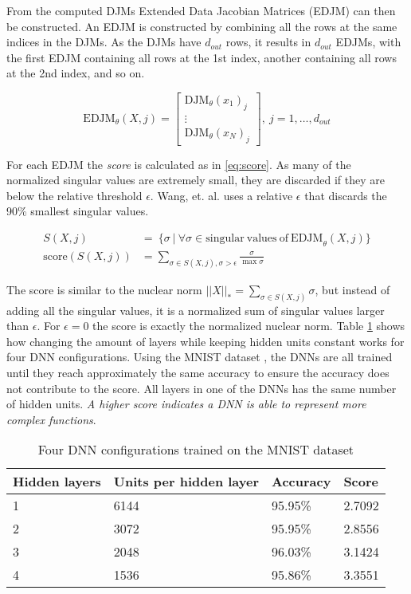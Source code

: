 From the computed DJMs Extended Data Jacobian Matrices (EDJM) can then be constructed. An EDJM is constructed by combining all the rows at the same indices in the DJMs. As the DJMs have $d_{out}$ rows, it results in $d_{out}$ EDJMs, with the first EDJM containing all rows at the 1st index, another containing all rows at the 2nd index, and so on.

\begin{equation} \label{eq:edjm}
\mathrm{EDJM}_{\theta}(X, j) =
\begin{bmatrix}
\mathrm{DJM}_{\theta}(x_1)_j \\
\vdots \\
\mathrm{DJM}_{\theta}(x_N)_j
\end{bmatrix},\ j=1,\dots,d_{out}
\end{equation}

For each EDJM the \textit{score} is calculated as in \eqref{eq:score}. As many of the normalized singular values are extremely small, they are discarded if they are below the relative threshold $\epsilon$. Wang, et. al. uses a relative $\epsilon$ that discards the 90\% smallest singular values.

\begin{equation} \label{eq:score}
  \begin{split}
  S(X, j) &=\ \{\sigma\ |\ \forall \sigma \in \mathrm{singular\ values\ of\ EDJM}_{\theta}(X, j) \} \\  
  \mathrm{score}(S(X, j)) &=  \sum_{\sigma \in S(X, j), \sigma > \epsilon} \frac{\sigma}{\max{\sigma}}  
  \end{split}
\end{equation}

The score is similar to the nuclear norm $||X||_* = \sum_{\sigma \in S(X, j)} \sigma$, but instead of adding all the singular values, it is a normalized sum of singular values larger than $\epsilon$. For $\epsilon=0$ the score is exactly the normalized nuclear norm. Table \ref{tab:dnn:score} shows how changing the amount of layers while keeping hidden units constant works for four DNN configurations. Using the MNIST dataset \cite{lecun:mnist}, the DNNs are all trained until they reach approximately the same accuracy to ensure the accuracy does not contribute to the score. All layers in one of the DNNs has the same number of hidden units. \textit{A higher score indicates a DNN is able to represent more complex functions}.

\begin{table}[H]
  \centering
    \begin{tabular}{|l|l|l|l|} \hline
      Hidden layers & Units per hidden layer & Accuracy & Score \\ \hline
      1 & 6144 & 95.95\% & 2.7092 \\ \hline
      2 & 3072 & 95.95\% & 2.8556 \\ \hline
      3 & 2048 & 96.03\% & 3.1424 \\ \hline
      4 & 1536 & 95.86\% & 3.3551 \\ \hline
    \end{tabular}
    \caption{Four DNN configurations trained on the MNIST dataset}
    \label{tab:dnn:score}
\end{table}

